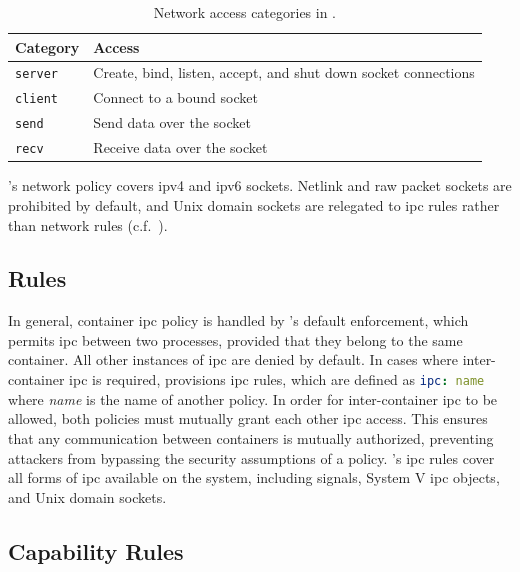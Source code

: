 \begin{table}[htpb]
  \centering
  \caption[Network access categories in \bpfcontain{}]{
    Network access categories in \bpfcontain{}.
  }%
  \label{tab:bpfcontain-network}
  \begin{tabular}{ll}
  \toprule
  Category & Access \\
  \midrule
  \texttt{server} & Create, bind, listen, accept, and shut down socket connections \\
  \texttt{client} & Connect to a bound socket \\
  \texttt{send} & Send data over the socket \\
  \texttt{recv} & Receive data over the socket \\
  \bottomrule
  \end{tabular}
\end{table}

\bpfcontain{}'s network policy covers \gls{ip}v4 and \gls{ip}v6 sockets. Netlink and raw
packet sockets are prohibited by default, and Unix domain sockets are relegated to
\gls{ipc} rules rather than network rules (c.f.\ ).

\subsection{ Rules}%
\label{ss:bpfcontain-ipc}

In general, container \gls{ipc} policy is handled by \bpfcontain{}'s default enforcement,
which permits \gls{ipc} between two processes, provided that they belong to the same
container. All other instances of \gls{ipc} are denied by default. In cases where
inter-container \gls{ipc} is required, \bpfcontain{} provisions \gls{ipc} rules, which are
defined as \lstinline[language=yaml]|ipc: name| where \textit{name} is the name of another
\bpfcontain{} policy. In order for inter-container \gls{ipc} to be allowed, both policies
must mutually grant each other \gls{ipc} access. This ensures that any communication
between containers is mutually authorized, preventing attackers from bypassing the
security assumptions of a policy. \bpfcontain{}'s \gls{ipc} rules cover all forms of
\gls{ipc} available on the system, including signals, System V \gls{ipc} objects, and Unix
domain sockets.

\subsection{Capability Rules}

